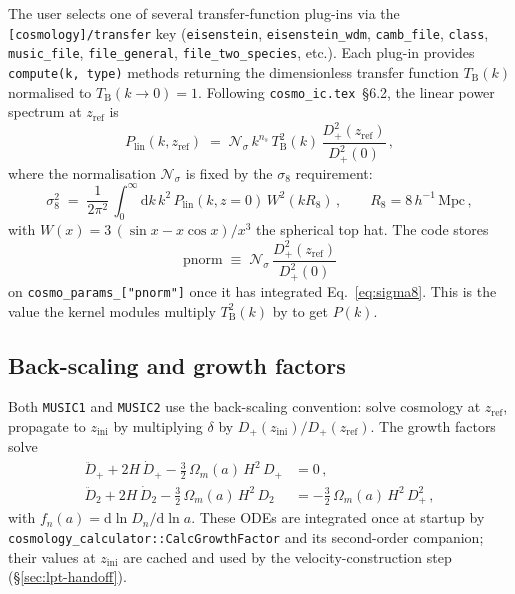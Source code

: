 \documentclass[12pt]{article}
\newcommand{\code}[1]{\texttt{#1}}
\begin{document}
The user selects one of several transfer-function plug-ins via the
\code{[cosmology]/transfer} key (\code{eisenstein},
\code{eisenstein\_wdm}, \code{camb\_file},
\code{class}, \code{music\_file}, \code{file\_general},
\code{file\_two\_species}, etc.).  Each plug-in provides
\code{compute(k, type)} methods returning the dimensionless transfer
function $T_\mathrm{B}(k)$ normalised to $T_\mathrm{B}(k\!\to\!0) = 1$.
Following \texttt{cosmo\_ic.tex}~\S6.2, the linear power spectrum at
$z_\mathrm{ref}$ is
\begin{equation}
  P_\mathrm{lin}(k, z_\mathrm{ref})
   \;=\; \mathcal{N}_\sigma\,k^{n_s}\,T_\mathrm{B}^2(k)\,
         \frac{D_+^2(z_\mathrm{ref})}{D_+^2(0)}\,,
  \label{eq:plin-zref}
\end{equation}
where the normalisation $\mathcal{N}_\sigma$ is fixed by the
$\sigma_8$ requirement:
\begin{equation}
  \sigma_8^2 \;=\; \frac{1}{2\pi^2}\,\int_0^\infty\!\mathrm{d}k\,k^2\,
                   P_\mathrm{lin}(k, z = 0)\,W^2(kR_8)\,,
  \qquad R_8 = 8\,h^{-1}\,\mathrm{Mpc}\,,
  \label{eq:sigma8}
\end{equation}
with $W(x) = 3\,(\sin x - x \cos x)/x^3$ the spherical top hat.  The
code stores
\begin{equation}
  \mathrm{pnorm} \;\equiv\; \mathcal{N}_\sigma\,
                            \frac{D_+^2(z_\mathrm{ref})}{D_+^2(0)}
  \label{eq:pnorm-def}
\end{equation}
on \code{cosmo\_params\_["pnorm"]} once it has integrated
Eq.~\eqref{eq:sigma8}.  This is the value the kernel modules
multiply $T_\mathrm{B}^2(k)$ by to get $P(k)$.

\subsection{Back-scaling and growth factors}
\label{sec:cosmo-growth}

Both \texttt{MUSIC1} and \texttt{MUSIC2} use the back-scaling
convention: solve cosmology at $z_\mathrm{ref}$, propagate to
$z_\mathrm{ini}$ by multiplying $\delta$ by
$D_+(z_\mathrm{ini})/D_+(z_\mathrm{ref})$.  The growth factors solve
\begin{align}
  \ddot{D}_+ + 2H\,\dot{D}_+ - \tfrac{3}{2}\,\Omega_m(a)\,H^2\,D_+ &= 0\,,
   \label{eq:growth-1}\\
  \ddot{D}_2 + 2H\,\dot{D}_2 - \tfrac{3}{2}\,\Omega_m(a)\,H^2\,D_2
        &= -\tfrac{3}{2}\,\Omega_m(a)\,H^2\,D_+^2\,,
   \label{eq:growth-2}
\end{align}
with $f_n(a) = \mathrm{d}\ln D_n/\mathrm{d}\ln a$.  These ODEs are
integrated once at startup by
\code{cosmology\_calculator::CalcGrowthFactor} and its second-order
companion; their values at $z_\mathrm{ini}$ are cached and used by
the velocity-construction step (\S\ref{sec:lpt-handoff}).
\end{document}
